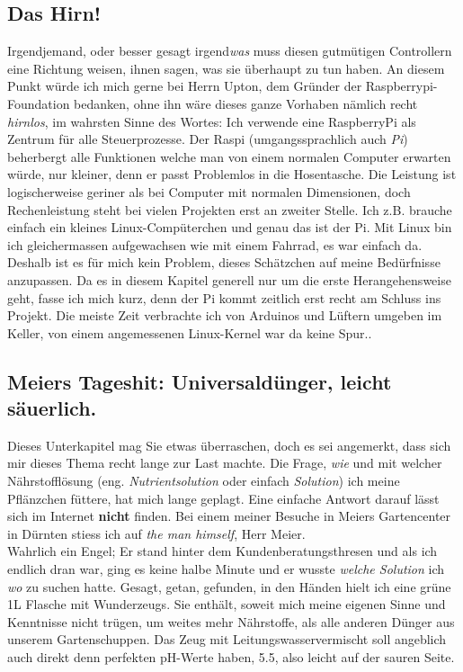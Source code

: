 \documentclass[12pt,titlepage,a4paper]{article}
\begin{document}
\subsection{Das Hirn!}
Irgendjemand, oder besser gesagt irgend\textit{was} muss diesen gutmütigen Controllern eine Richtung weisen, ihnen sagen, was sie überhaupt zu tun haben. An diesem Punkt würde ich mich gerne bei Herrn Upton, dem Gründer der Raspberrypi-Foundation bedanken, ohne ihn wäre dieses ganze Vorhaben nämlich recht \textit{hirnlos}, im wahrsten Sinne des Wortes: Ich verwende eine RaspberryPi als Zentrum für alle Steuerprozesse. Der Raspi (umgangssprachlich auch \textit{Pi}) beherbergt alle Funktionen welche man von einem normalen Computer erwarten würde, nur kleiner, denn er passt Problemlos in die Hosentasche. Die Leistung ist logischerweise geriner als bei Computer mit normalen Dimensionen, doch Rechenleistung steht bei vielen Projekten erst an zweiter Stelle. Ich z.B. brauche einfach ein kleines Linux-Compüterchen und genau das ist der Pi. Mit Linux bin ich gleichermassen aufgewachsen wie mit einem Fahrrad, es war einfach da. Deshalb ist es für mich kein Problem, dieses Schätzchen auf meine Bedürfnisse anzupassen. Da es in diesem Kapitel generell nur um die erste Herangehensweise geht, fasse ich mich kurz, denn der Pi kommt zeitlich erst recht am Schluss ins Projekt. Die meiste Zeit verbrachte ich von Arduinos und Lüftern umgeben im Keller, von einem angemessenen Linux-Kernel war da keine Spur..


\subsection{Meiers Tageshit: Universaldünger, leicht säuerlich.}
Dieses Unterkapitel mag Sie etwas überraschen, doch es sei angemerkt, dass sich mir dieses Thema recht lange zur Last machte. Die Frage, \textit{wie} und mit welcher Nährstofflösung (eng. \textit{Nutrientsolution} oder einfach \textit{Solution}) ich meine Pflänzchen füttere, hat mich lange geplagt. Eine einfache Antwort darauf lässt sich im Internet \textbf{nicht} finden. Bei einem meiner Besuche in Meiers Gartencenter in Dürnten stiess ich auf \textit{the man himself}, Herr Meier. \\ Wahrlich ein Engel; Er stand hinter dem Kundenberatungsthresen und als ich endlich dran war, ging es keine halbe Minute und er wusste \textit{welche Solution} ich \textit{wo} zu suchen hatte. Gesagt, getan, gefunden, in den Händen hielt ich eine grüne 1L Flasche mit Wunderzeugs. Sie enthält, soweit mich meine eigenen Sinne und Kenntnisse nicht trügen, um weites mehr Nährstoffe, als alle anderen Dünger aus unserem Gartenschuppen. Das Zeug mit Leitungswasservermischt soll angeblich auch direkt denn perfekten pH-Werte haben, 5.5, also leicht auf der sauren Seite.
\end{document}
